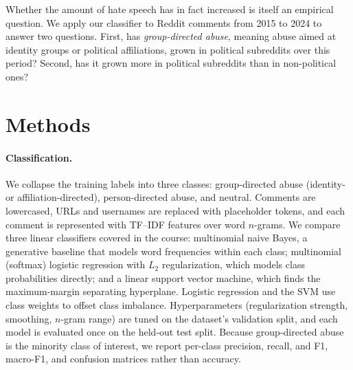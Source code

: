 \documentclass{article}
\begin{document}
Whether the amount of hate speech has in fact increased is itself an empirical question.
We apply our classifier to Reddit comments from 2015 to 2024 to answer two questions.
First, has \emph{group-directed abuse}, meaning abuse aimed at identity groups or political affiliations, grown in political subreddits over this period?
Second, has it grown more in political subreddits than in non-political ones?

\section{Methods}

\paragraph{Classification.} We collapse the training labels into three classes: group-directed abuse (identity- or affiliation-directed), person-directed abuse, and neutral.
Comments are lowercased, URLs and usernames are replaced with placeholder tokens, and each comment is represented with TF--IDF features over word $n$-grams.
We compare three linear classifiers covered in the course: multinomial naive Bayes, a generative baseline that models word frequencies within each class; multinomial (softmax) logistic regression with $L_2$ regularization, which models class probabilities directly; and a linear support vector machine, which finds the maximum-margin separating hyperplane.
Logistic regression and the SVM use class weights to offset class imbalance.
Hyperparameters (regularization strength, smoothing, $n$-gram range) are tuned on the dataset's validation split, and each model is evaluated once on the held-out test split.
Because group-directed abuse is the minority class of interest, we report per-class precision, recall, and F1, macro-F1, and confusion matrices rather than accuracy.
\end{document}
